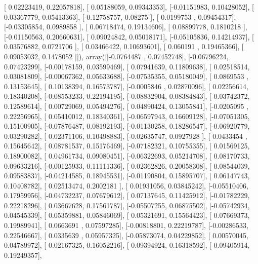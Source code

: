 \documentclass{article}
\begin{document}
       [ 0.02223419,  0.22057818],
       [ 0.05188059,  0.09343353],
       [-0.01151983,  0.10428052],
       [ 0.03367779,  0.05413363],
       [-0.12758757,  0.08275   ],
       [ 0.0199753 ,  0.09454317],
       [-0.03305854,  0.0989858 ],
       [ 0.06718474,  0.19134606],
       [ 0.08899778,  0.1810218 ],
       [-0.01150563,  0.20660631],
       [ 0.09024842,  0.05018171],
       [-0.05105836,  0.14214937],
       [ 0.03576882,  0.0721706 ],
       [ 0.03466422,  0.10693601],
       [ 0.060191  ,  0.19465366],
       [ 0.09053032,  0.1478052 ]]), array([[-0.0764487 ,  0.07452748],
       [-0.06796224,  0.07423299],
       [-0.00178159,  0.03599469],
       [ 0.07941639,  0.11809638],
       [ 0.02518514,  0.03081809],
       [-0.00067362,  0.05633688],
       [-0.07535355,  0.05180049],
       [ 0.0869553 ,  0.13153645],
       [ 0.10138394,  0.16573787],
       [-0.0005846 ,  0.02870096],
       [ 0.02256614,  0.18340208],
       [-0.08553233,  0.22194195],
       [-0.08832904,  0.08384843],
       [ 0.03742372,  0.12589614],
       [ 0.00729069,  0.05494276],
       [ 0.04890424,  0.13055841],
       [-0.0205095 ,  0.22256965],
       [ 0.05410012,  0.18340361],
       [-0.06597943,  0.16609128],
       [-0.07051305,  0.15100905],
       [-0.07876487,  0.08192193],
       [-0.01130258,  0.18286547],
       [-0.06920779,  0.03290282],
       [ 0.02371106,  0.10498883],
       [-0.02635747,  0.0927928 ],
       [ 0.0433454 ,  0.15645642],
       [ 0.08781537,  0.15176469],
       [-0.07182321,  0.10755355],
       [ 0.01569125,  0.18900082],
       [ 0.04961734,  0.09080451],
       [-0.06322693,  0.05214708],
       [ 0.08170733,  0.09633216],
       [-0.00125933,  0.11111336],
       [ 0.02362826,  0.20058308],
       [ 0.08544039,  0.09583837],
       [-0.04214585,  0.18945531],
       [-0.01190804,  0.15895707],
       [ 0.06147743,  0.10408782],
       [ 0.02513474,  0.2002181 ],
       [ 0.01931056,  0.03845242],
       [-0.05510406,  0.17959956],
       [-0.04732237,  0.07679612],
       [ 0.07137645,  0.11425912],
       [-0.01782229,  0.22218296],
       [ 0.03667628,  0.17561787],
       [-0.05507255,  0.06875502],
       [-0.05742934,  0.04545339],
       [ 0.05359881,  0.05846069],
       [ 0.05321691,  0.15564423],
       [ 0.07669373,  0.19989941],
       [ 0.0663691 ,  0.07597285],
       [-0.00818801,  0.22219787],
       [-0.00286533,  0.22546667],
       [ 0.0335639 ,  0.05957325],
       [-0.05873074,  0.04229852],
       [ 0.00570045,  0.04789972],
       [ 0.02167325,  0.16052216],
       [ 0.09394924,  0.16318592],
       [-0.09405914,  0.19249357],
\end{document}
